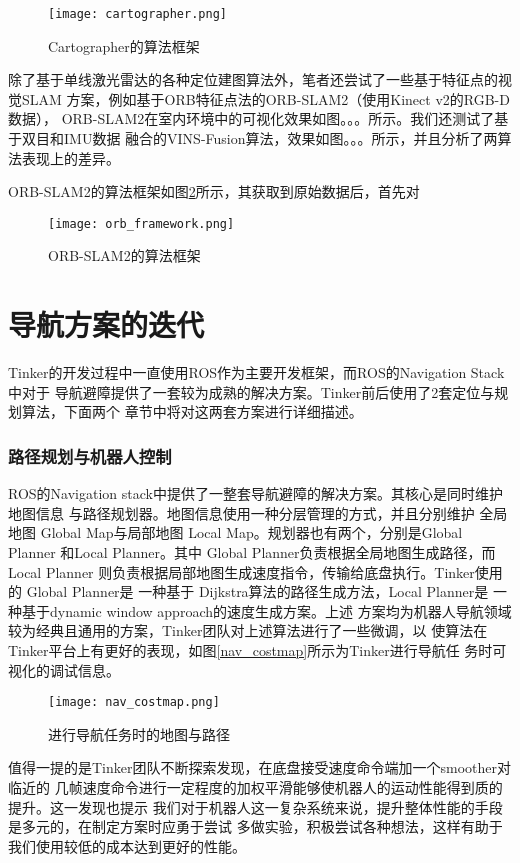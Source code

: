 \begin{figure}[h] %
  \centering
  \texttt{[image: cartographer.png]}
  \caption{Cartographer的算法框架}
  \label{fig:cartographer}
\end{figure}

除了基于单线激光雷达的各种定位建图算法外，笔者还尝试了一些基于特征点的视觉SLAM
方案，例如基于ORB特征点法的ORB-SLAM2（使用Kinect v2的RGB-D数据）\cite{mur2015orb}，
ORB-SLAM2在室内环境中的可视化效果如图。。。所示。我们还测试了基于双目和IMU数据
融合的VINS-Fusion\cite{qin2018vins}算法，效果如图。。。所示，并且分析了两算法表现上的差异。

ORB-SLAM2的算法框架如图\ref{fig:orb_frame}所示，其获取到原始数据后，首先对



\begin{figure}[h] %
  \centering
  \texttt{[image: orb\_framework.png]}
  \caption{ORB-SLAM2的算法框架}
  \label{fig:orb_frame}
\end{figure}


\section{导航方案的迭代}

Tinker的开发过程中一直使用ROS作为主要开发框架，而ROS的Navigation Stack中对于
导航避障提供了一套较为成熟的解决方案。Tinker前后使用了2套定位与规划算法，下面两个
章节中将对这两套方案进行详细描述。

\subsubsection{路径规划与机器人控制}

ROS的Navigation stack中提供了一整套导航避障的解决方案。其核心是同时维护地图信息
与路径规划器。地图信息使用一种分层管理的方式\cite{lu2014layered}，并且分别维护
全局地图 Global Map与局部地图 Local Map。规划器也有两个，分别是Global Planner
和Local Planner。其中 Global Planner负责根据全局地图生成路径，而 Local Planner
则负责根据局部地图生成速度指令，传输给底盘执行。Tinker使用的 Global Planner是
一种基于 Dijkstra算法\cite{deng2012fuzzy}的路径生成方法，Local Planner是
一种基于dynamic window approach的速度生成方案\cite{fox1997dynamic}。上述
方案均为机器人导航领域较为经典且通用的方案，Tinker团队对上述算法进行了一些微调，以
使算法在Tinker平台上有更好的表现，如图\ref{nav_costmap}所示为Tinker进行导航任
务时可视化的调试信息。

\begin{figure}[h] %
  \centering
  \texttt{[image: nav\_costmap.png]}
  \caption{进行导航任务时的地图与路径}
  \label{fig:nav_costmap}
\end{figure}


值得一提的是Tinker团队不断探索发现，在底盘接受速度命令端加一个smoother对临近的
几帧速度命令进行一定程度的加权平滑能够使机器人的运动性能得到质的提升。这一发现也提示
我们对于机器人这一复杂系统来说，提升整体性能的手段是多元的，在制定方案时应勇于尝试
多做实验，积极尝试各种想法，这样有助于我们使用较低的成本达到更好的性能。

